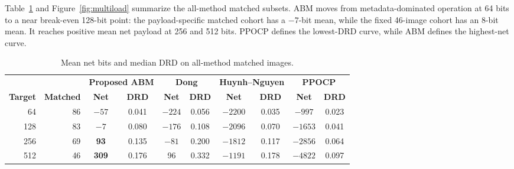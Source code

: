 \documentclass[a4paper,fleqn]{cas-dc}
\newcommand{\RevisionAddBegin}{\begingroup\color{revisionblue}}
\newcommand{\RevisionAddEnd}{\endgroup}
\begin{document}
Table~\ref{tab:multiload} and Figure~\ref{fig:multiload} summarize the
\RevisionAddBegin
all-method matched subsets. ABM moves from metadata-dominated operation at
64 bits to a near break-even 128-bit point: the payload-specific matched cohort
has a $-7$-bit mean, while the fixed 46-image cohort has an 8-bit mean. It
reaches positive mean net payload at 256 and 512 bits. PPOCP defines the
lowest-DRD curve, while ABM defines the highest-net curve.
\RevisionAddEnd

\begin{table}[t]
\centering
\caption{Mean net bits and median DRD on all-method matched images.}
\label{tab:multiload}
\begin{tabular*}{\textwidth}{@{\extracolsep{\fill}}rrcccccccc@{}}
\toprule
& & \multicolumn{2}{c}{\textbf{Proposed ABM}} &
\multicolumn{2}{c}{\textbf{Dong}} &
\multicolumn{2}{c}{\textbf{Huynh--Nguyen}} &
\multicolumn{2}{c}{\textbf{PPOCP}} \\
\cmidrule(lr){3-4}\cmidrule(lr){5-6}\cmidrule(lr){7-8}\cmidrule(lr){9-10}
\textbf{Target} & \textbf{Matched} & \textbf{Net} & \textbf{DRD} &
\textbf{Net} & \textbf{DRD} & \textbf{Net} & \textbf{DRD} &
\textbf{Net} & \textbf{DRD} \\
\midrule
64  & 86 & $-57$ & 0.041 & $-224$ & 0.056 & $-2200$ & 0.035 & $-997$ & 0.023 \\
128 & 83 & $-7$  & 0.080 & $-176$ & 0.108 & $-2096$ & 0.070 & $-1653$ & 0.041 \\
256 & 69 & \textbf{93} & 0.135 & $-81$ & 0.200 & $-1812$ & 0.117 & $-2856$ & 0.064 \\
512 & 46 & \textbf{309} & 0.176 & 96 & 0.332 & $-1191$ & 0.178 & $-4822$ & 0.097 \\
\bottomrule
\end{tabular*}
\end{table}
\end{document}
